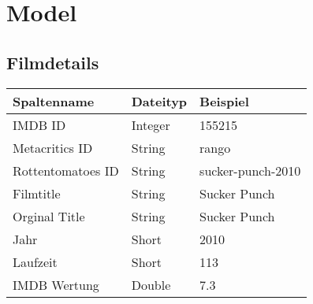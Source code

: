 \section{Model}
\subsection{Filmdetails}
\begin{center}
\begin{tabular}{|l|l|l|}
\hline
Spaltenname & Dateityp & Beispiel \\
\hline
\hline
IMDB ID & Integer & 155215\\
Metacritics ID & String & rango\\
Rottentomatoes ID & String & sucker-punch-2010\\
Filmtitle & String & Sucker Punch\\
Orginal Title & String & Sucker Punch\\
Jahr & Short & 2010\\
Laufzeit & Short & 113\\
IMDB Wertung & Double & 7.3\\
\hline
\end{tabular}
\end{center}